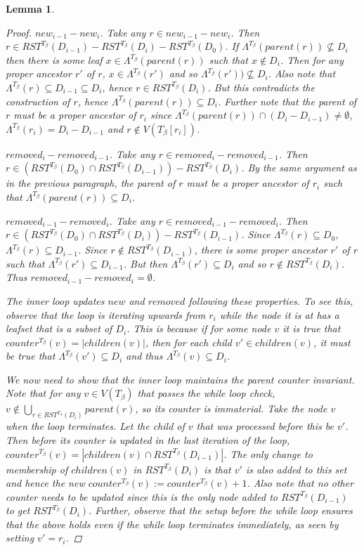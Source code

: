 \documentclass{article}
\newcommand{\leafset}{\Lambda}
\newcommand{\TB}{T_\beta}
\newtheorem{computerootsofsubtreescorrectness}[incompatibility]{Lemma}
\begin{document}
\begin{computerootsofsubtreescorrectness}
\begin{proof}
            \textit{$new_{i-1} - new_i$.} Take any $r \in new_{i-1} - new_i$. Then $r \in RST^{\TB}(D_{i-1}) - RST^{\TB}(D_i) - RST^{\TB}(D_0)$. If $\leafset^{\TB}(parent(r)) \not\subseteq D_i$ then there is some leaf $x \in \leafset^{\TB}(parent(r))$ such that $x \not\in D_i$. Then for any proper ancestor $r'$ of $r$, $x \in \leafset^{\TB}(r')$ and so $\leafset^{\TB}(r')) \not\subseteq D_i$. Also note that $\leafset^{\TB}(r) \subseteq D_{i-1} \subseteq D_i$, hence $r \in RST^{\TB}(D_i)$. But this contradicts the construction of $r$, hence $\leafset^{\TB}(parent(r)) \subseteq D_i$. Further note that the parent of $r$ must be a proper ancestor of $r_i$ since $\leafset^{\TB}(parent(r)) \cap (D_i - D_{i-1}) \neq \emptyset$, $\leafset^{\TB}(r_i) = D_i - D_{i-1}$ and $r \not\in V(\TB[r_i])$.

            \textit{$removed_i - removed_{i-1}$.} Take any $r \in removed_i - removed_{i-1}$. Then $r \in (RST^{\TB}(D_0) \cap RST^{\TB}(D_{i-1})) - RST^{\TB}(D_i)$. By the same argument as in the previous paragraph, the parent of $r$ must be a proper ancestor of $r_i$ such that $\leafset^{\TB}(parent(r)) \subseteq D_i$.

            \textit{$removed_{i-1} - removed_i$.} Take any $r \in removed_{i-1} - removed_i$. Then $r \in (RST^{\TB}(D_0) \cap RST^{\TB}(D_i)) - RST^{\TB}(D_{i-1})$. Since $\leafset^{\TB}(r) \subseteq D_0$, $\leafset^{\TB}(r) \subseteq D_{i-1}$. Since $r \not\in RST^{\TB}(D_{i-1})$, there is some proper ancestor $r'$ of $r$ such that $\leafset^{\TB}(r') \subseteq D_{i-1}$. But then $\leafset^{\TB}(r') \subseteq D_i$ and so $r \not\in RST^{\TB}(D_i)$. Thus $removed_{i-1} - removed_i = \emptyset$.

            The inner loop updates $new$ and $removed$ following these properties. To see this, observe that the loop is iterating upwards from $r_i$ while the node it is at has a leafset that is a subset of $D_i$. This is because if for some node $v$ it is true that $counter^{\TB}(v) = |children(v)|$, then for each child $v' \in children(v)$, it must be true that $\leafset^{\TB}(v') \subseteq D_i$ and thus $\leafset^{\TB}(v) \subseteq D_i$.

            We now need to show that the inner loop maintains the parent counter invariant. Note that for any $v \in V(\TB)$ that passes the while loop check, $v \not\in \bigcup_{r \in RST^{\TB}(D_i)} parent(r)$, so its counter is immaterial. Take the node $v$ when the loop terminates. Let the child of $v$ that was processed before this be $v'$. Then before its counter is updated in the last iteration of the loop, $counter^{\TB}(v) = |children(v) \cap RST^{\TB}(D_{i-1})|$. The only change to membership of $children(v)$ in $RST^{\TB}(D_i)$ is that $v'$ is also added to this set and hence the new $counter^{\TB}(v) := counter^{\TB}(v) + 1$. Also note that no other counter needs to be updated since this is the only node added to $RST^{\TB}(D_{i-1})$ to get $RST^{\TB}(D_i)$. Further, observe that the setup before the while loop ensures that the above holds even if the while loop terminates immediately, as seen by setting $v' = r_i$.


\end{proof}
\end{computerootsofsubtreescorrectness}
\end{document}
